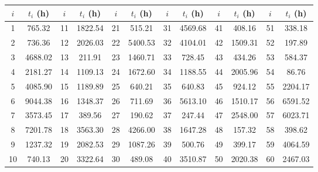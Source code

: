 \documentclass{article}
\begin{document}
\begin{table}[H]
    \centering
    \begin{tabular}{|*{12}{c|}}
        \hline
        $i$ & $t_i$ (h) & $i$ & $t_i$ (h) & $i$ & $t_i$ (h) & $i$ & $t_i$ (h) & $i$ & $t_i$ (h) & $i$ & $t_i$ (h) \\
        \hline
        1   & 765.32    & 11  & 1822.54   & 21  & 515.21    & 31  & 4569.68   & 41  & 408.16    & 51  & 338.18    \\
        2   & 736.36    & 12  & 2026.03   & 22  & 5400.53   & 32  & 4104.01   & 42  & 1509.31   & 52  & 197.89    \\
        3   & 4688.02   & 13  & 211.91    & 23  & 1460.71   & 33  & 728.45    & 43  & 434.26    & 53  & 584.37    \\
        4   & 2181.27   & 14  & 1109.13   & 24  & 1672.60   & 34  & 1188.55   & 44  & 2005.96   & 54  & 86.76     \\
        5   & 4085.90   & 15  & 1189.89   & 25  & 640.21    & 35  & 640.83    & 45  & 924.12    & 55  & 2204.17   \\
        6   & 9044.38   & 16  & 1348.37   & 26  & 711.69    & 36  & 5613.10   & 46  & 1510.17   & 56  & 6591.52   \\
        7   & 3573.45   & 17  & 389.56    & 27  & 190.62    & 37  & 247.44    & 47  & 2548.00   & 57  & 6023.71   \\
        8   & 7201.78   & 18  & 3563.30   & 28  & 4266.00   & 38  & 1647.28   & 48  & 157.32    & 58  & 398.62    \\
        9   & 1237.32   & 19  & 2082.53   & 29  & 1087.26   & 39  & 500.76    & 49  & 399.17    & 59  & 4064.59   \\
        10  & 740.13    & 20  & 3322.64   & 30  & 489.08    & 40  & 3510.87   & 50  & 2020.38   & 60  & 2467.03   \\
        \hline
    \end{tabular}
    \label{table:4}
\end{table}
\end{document}
